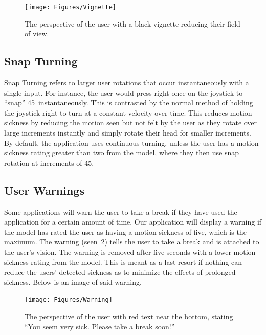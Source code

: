 \begin{figure}[h!]
    \texttt{[image: Figures/Vignette]}
    \centering
    \caption{The perspective of the user with a black vignette reducing their field of view.}
    \label{fig:vignetting_example}
\end{figure}

\subsection{Snap Turning}
\label{subsec:snap_turn}

Snap Turning refers to larger user rotations that occur instantaneously with a single input.
For instance, the user would press right once on the joystick to ``snap'' 45\textdegree~instantaneously.
This is contrasted by the normal method of holding the joystick right to turn at a constant velocity over time.
This reduces motion sickness by reducing the motion seen but not felt by the user as they rotate over large increments instantly and simply rotate their head for smaller increments.
By default, the application uses continuous turning, unless the user has a motion sickness rating greater than two from the model, where they then use snap rotation at increments of 45\textdegree.

\subsection{User Warnings}
\label{subsec:user_warnings}

Some applications will warn the user to take a break if they have used the application for a certain amount of time.
Our application will display a warning if the model has rated the user as having a motion sickness of five, which is the maximum.
The warning (seen~\ref{fig:user_warning}) tells the user to take a break and is attached to the user's vision.
The warning is removed after five seconds with a lower motion sickness rating from the model.
This is meant as a last resort if nothing can reduce the users' detected sickness as to minimize the effects of prolonged sickness.
Below is an image of said warning.

\begin{figure}[h!]
    \texttt{[image: Figures/Warning]}
    \centering
    \caption{The perspective of the user with red text near the bottom, stating ``You seem very sick. Please take a break soon!''}
    \label{fig:user_warning}
\end{figure}


